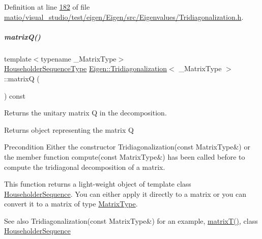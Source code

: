 Definition at line \hyperlink{matio_2visual__studio_2test_2eigen_2_eigen_2src_2_eigenvalues_2_tridiagonalization_8h_source_l00182}{182} of file \hyperlink{matio_2visual__studio_2test_2eigen_2_eigen_2src_2_eigenvalues_2_tridiagonalization_8h_source}{matio/visual\+\_\+studio/test/eigen/\+Eigen/src/\+Eigenvalues/\+Tridiagonalization.\+h}.

\mbox{\label{group___eigenvalues___module_a000f7392eda930576ffd2af1fae54af2}} 
\subparagraph{\texorpdfstring{matrix\+Q()}{matrixQ()}\hspace{0.1cm}{\footnotesize\ttfamily [1/2]}}
{\footnotesize\ttfamily template$<$typename \+\_\+\+Matrix\+Type$>$ \\
\hyperlink{group___eigenvalues___module_af322315c8bea9990152c9d09bfa2a69f}{Householder\+Sequence\+Type} \hyperlink{group___eigenvalues___module_class_eigen_1_1_tridiagonalization}{Eigen\+::\+Tridiagonalization}$<$ \+\_\+\+Matrix\+Type $>$\+::matrixQ (\begin{DoxyParamCaption}{ }\end{DoxyParamCaption}) const\hspace{0.3cm}{\ttfamily [inline]}}



Returns the unitary matrix Q in the decomposition. 

\begin{DoxyReturn}{Returns}
object representing the matrix Q
\end{DoxyReturn}
\begin{DoxyPrecond}{Precondition}
Either the constructor Tridiagonalization(const Matrix\+Type\&) or the member function compute(const Matrix\+Type\&) has been called before to compute the tridiagonal decomposition of a matrix.
\end{DoxyPrecond}
This function returns a light-\/weight object of template class \hyperlink{group___householder___module_class_eigen_1_1_householder_sequence}{Householder\+Sequence}. You can either apply it directly to a matrix or you can convert it to a matrix of type \hyperlink{group___eigenvalues___module_add0f4b2216d0ea8ee0f7d8525deaf0a9}{Matrix\+Type}.

\begin{DoxySeeAlso}{See also}
Tridiagonalization(const Matrix\+Type\&) for an example, \hyperlink{group___eigenvalues___module_a6eb5ef94b8b9bb013c0e69b6df56d0df}{matrix\+T()}, class \hyperlink{group___householder___module_class_eigen_1_1_householder_sequence}{Householder\+Sequence} 
\end{DoxySeeAlso}



